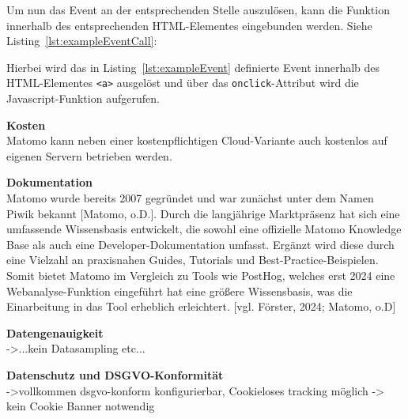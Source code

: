 Um nun das Event an der entsprechenden Stelle auszulösen, kann die Funktion innerhalb des entsprechenden HTML-Elementes eingebunden werden. Siehe Listing~\ref{lst:exampleEventCall}: 

\FloatBarrier
\begin{minipage}{\linewidth}

\end{minipage}

Hierbei wird das in Listing~\ref{lst:exampleEvent} definierte Event innerhalb des HTML-Elementes \texttt{<a>} ausgelöst und über das \texttt{onclick}-Attribut wird die Javascript-Funktion aufgerufen.

\textbf{Kosten} \\
Matomo kann neben einer kostenpflichtigen Cloud-Variante auch kostenlos auf eigenen Servern betrieben werden. 

\textbf{Dokumentation} \\
Matomo wurde bereits 2007 gegründet und war zunächst unter dem Namen Piwik bekannt [Matomo, o.D.]. Durch die langjährige Marktpräsenz hat sich eine umfassende Wissensbasis entwickelt, die sowohl eine offizielle Matomo Knowledge Base als auch eine Developer-Dokumentation umfasst. Ergänzt wird diese durch eine Vielzahl an praxisnahen Guides, Tutorials und Best-Practice-Beispielen. Somit bietet Matomo im Vergleich zu Tools wie PostHog, welches erst 2024 eine Webanalyse-Funktion eingeführt hat eine größere Wissensbasis, was die Einarbeitung in das Tool erheblich erleichtert. [vgl. Förster, 2024; Matomo, o.D]

\textbf{Datengenauigkeit} \\
->...kein Datasampling etc...

\textbf{Datenschutz und DSGVO-Konformität} \\
->vollkommen dsgvo-konform konfigurierbar, Cookieloses tracking möglich -> kein Cookie Banner notwendig